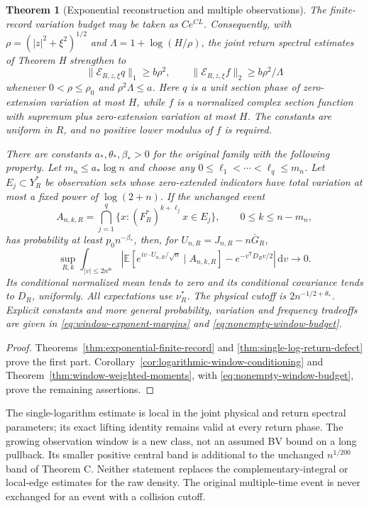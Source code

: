 \documentclass[11pt,reqno]{amsart}
\numberwithin{equation}{section}
\newtheorem{maintheorem}{Theorem}
\theoremstyle{definition}\newtheorem{definition}[theorem]{Definition}
\theoremstyle{remark}\newtheorem{remark}[theorem]{Remark}
\newcommand{\dd}{\,\mathrm d}\newcommand{\one}{\mathbf1}
\begin{document}
\begin{maintheorem}[Exponential reconstruction and multiple observations]
\label{thm:intro-window-reconstruction}
The finite-record variation budget may be taken as $Ce^{CL}$.
Consequently, with $\rho=(|z|^2+\xi^2)^{1/2}$ and
$\Lambda=1+\log(H/\rho)$, the joint return spectral estimates of
Theorem H strengthen to
\[
 \|\mathcal E_{R,z,\xi}q\|_1\ge b\rho^2,\qquad
 \|\mathcal E_{R,z,\xi}f\|_2\ge b\rho^2/\Lambda
\]
whenever $0<\rho\le\rho_0$ and $\rho^2\Lambda\le a$.
Here $q$ is a unit section phase of zero-extension variation at most
$H$, while $f$ is a normalized complex section function with supremum
plus zero-extension variation at most $H$. The constants are uniform
in $R$, and no positive lower modulus of $f$ is required.

There are constants $a_*,\theta_*,\beta_*>0$ for the original family
with the following property. Let $m_n\le a_*\log n$ and choose any
$0\le\ell_1<\cdots<\ell_q\le m_n$. Let $E_j\subset Y_R^*$ be
observation sets whose zero-extended indicators have total variation
at most a fixed power of $\log(2+n)$. If the unchanged event
\[
 A_{n,k,R}=\bigcap_{j=1}^{q}
       \{x:(F_R^*)^{k+\ell_j}x\in E_j\},\qquad
                       0\le k\le n-m_n,
\]
has probability at least $p_0 n^{-\beta_*}$, then, for
$U_{n,R}=J_{n,R}-n\bar G_R$,
\[
 \sup_{R,k}\int_{|v|\le2n^{\theta_*}}
 \left|\mathbb E[e^{iv\cdot U_{n,R}/\sqrt n}\mid A_{n,k,R}]
                          -e^{-v^{\mathsf T}D_Rv/2}\right|\dd v
                           \longrightarrow0.
\]
Its conditional normalized mean tends to zero and its conditional
covariance tends to $D_R$, uniformly. All expectations use $\nu_R^*$.
The physical cutoff is $2n^{-1/2+\theta_*}$. Explicit constants and
more general probability, variation and frequency tradeoffs are given
in \eqref{eq:window-exponent-margins} and
\eqref{eq:nonempty-window-budget}.
\end{maintheorem}
\begin{proof}
Theorems~\ref{thm:exponential-finite-record} and
\ref{thm:single-log-return-defect} prove the first part.
Corollary~\ref{cor:logarithmic-window-conditioning} and
Theorem~\ref{thm:window-weighted-moments}, with
\eqref{eq:nonempty-window-budget}, prove the remaining assertions.
\end{proof}

The single-logarithm estimate is local in the joint physical and return
spectral parameters; its exact lifting identity remains valid at every
return phase. The growing observation window is a new class, not an
assumed BV bound on a long pullback. Its smaller positive central band
is additional to the unchanged $n^{1/200}$ band of Theorem C.
Neither statement replaces the complementary-integral or local-edge
estimates for the raw density. The original multiple-time event is
never exchanged for an event with a collision cutoff.
\end{document}
